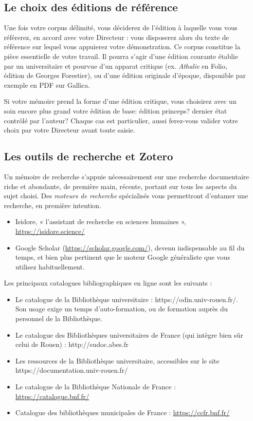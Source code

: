 \documentclass[12pt,twoside,final,openright]{book}
\begin{document}
\subsection{Le choix des éditions de référence}
Une fois votre corpus délimité, vous déciderez de l’édition à laquelle vous vous référerez, en accord avec votre Directeur : vous disposerez alors du texte de référence sur lequel vous appuierez votre démonstration. Ce corpus constitue la pièce essentielle de votre travail. Il pourra s’agir d’une édition courante établie par un universitaire et pourvue d’un apparat critique (ex. \textit{Athalie }en Folio, édition de Georges Forestier), ou d’une édition originale d’époque, disponible par exemple en PDF sur Gallica.

Si votre mémoire prend la forme d’une édition critique, vous choisirez avec un soin encore plus grand votre édition de base: édition princeps? dernier état contrôlé par l’auteur? Chaque cas est particulier, aussi ferez-vous valider votre choix par votre Directeur avant toute saisie.

\subsection{Les outils de recherche et Zotero}
Un mémoire de recherche s’appuie nécessairement sur une recherche documentaire riche et abondante, de première main, récente, portant sur tous les aspects du sujet choisi. 
Des \textit{moteurs de recherche} spécialisés vous permettront d’entamer une recherche, en première intention.

\begin{itemize}
	\item Isidore, « l’assistant de recherche en sciences humaines », \url{https://isidore.science/}
	\item Google Scholar (\url{https://scholar.google.com/}), devenu indispensable au fil du temps, et bien plus pertinent que le moteur Google généraliste que vous utilisez habituellement.
\end{itemize}

Les principaux catalogues bibliographiques en ligne sont les suivants :

\begin{itemize}
	\item Le catalogue de la Bibliothèque universitaire : https://odin.univ-rouen.fr/. Son usage exige un temps d’auto-formation, ou de formation auprès du personnel de la Bibliothèque.
	\item Le catalogue des Bibliothèques universitaires de France (qui intègre bien sûr celui de Rouen) : http://sudoc.abes.fr 
	\item Les ressources de la Bibliothèque universitaire, accessibles sur le site https://documentation.univ-rouen.fr/ 
	\item Le catalogue de la Bibliothèque Nationale de France : \url{https://catalogue.bnf.fr/}
	\item Catalogue des bibliothèques municipales de France : \url{https://ccfr.bnf.fr/}
\end{itemize}
\end{document}
